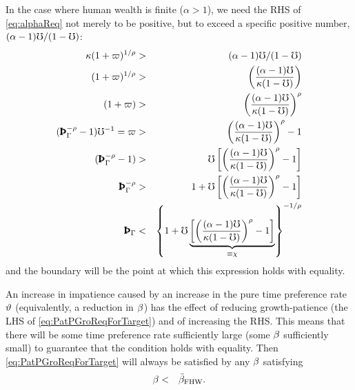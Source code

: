 \documentclass{handout}
\begin{document}
In the case where human wealth is finite ($\alpha > 1$), we need the RHS of \eqref{eq:alphaReq} not merely to be positive, but to exceed a specific positive number, $(\alpha-1)\mho/(1-\mho)$:  
\begin{eqnarray}
    \MPCU (1+\varpi)^{1/\CRRA} & > & (\alpha-1)\urate/(1-\urate)
\\   (1+\varpi)^{1/\CRRA} & > & \left(\frac{(\alpha-1)\urate}{\MPCU (1-\urate)}\right)
\\   (1+\varpi) & > & \left(\frac{(\alpha-1)\urate}{\MPCU (1-\urate)}\right)^{\CRRA}
\\  (\PatPGro^{-\CRRA}-1)\urate^{-1} = \varpi & > & \left(\frac{(\alpha-1)\urate}{\MPCU (1-\urate)}\right)^{\CRRA}-1
\\  (\PatPGro^{-\CRRA}-1) & > & \urate \left[\left(\frac{(\alpha-1)\urate}{\MPCU (1-\urate)}\right)^{\CRRA}-1\right]
\\  \PatPGro^{-\CRRA} & > & 1  + \urate \left[\left(\frac{(\alpha-1)\urate}{\MPCU (1-\urate)}\right)^{\CRRA}-1\right]
\\  \PatPGro & < & \left\{1  + \urate \underbrace{\left[\left(\frac{(\alpha-1)\urate}{\MPCU (1-\urate)}\right)^{\CRRA}-1\right]}_{\equiv \chi} \right\}^{-1/\CRRA} \label{eq:PatPGroReqForTarget}
\end{eqnarray}
and the boundary will be the point at which this expression holds with equality.  

An increase in impatience caused by an increase in the pure time preference rate $\vartheta$ (equivalently, a reduction in $\beta$) has the effect of reducing growth-patience (the LHS of \eqref{eq:PatPGroReqForTarget}) and of increasing the RHS.  This means that there will be some time preference rate sufficiently large (some $\beta$ sufficiently small) to guarantee that the condition holds with equality.  Then \eqref{eq:PatPGroReqForTarget} will always be satisfied by any $\beta$ satisfying \providecommand{\DiscountMaxGICWhenFHWCTBSHolds}{\ensuremath{\bar{\Discount}_{\text{FHW}}}}
\begin{eqnarray}
  \Discount & < & \DiscountMaxGICWhenFHWCTBSHolds \label{eq:DiscountMaxGICWhenFHWCTBSHolds}
.\end{eqnarray}
\end{document}
